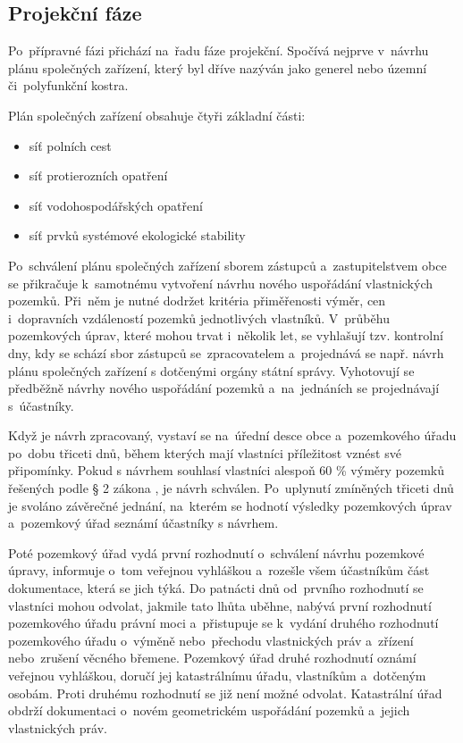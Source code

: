 \subsection{Projekční fáze}
\label{projekcni_faze}

Po~přípravné fázi přichází na~řadu fáze projekční. Spočívá nejprve
v~návrhu plánu společných zařízení, který byl dříve nazýván jako
generel nebo územní či~polyfunkční kostra.

Plán společných zařízení obsahuje čtyři základní části:
\vspace{-\topsep}
	\begin{itemize}[leftmargin=1.5cm, noitemsep]
		\item síť polních cest
		\item síť protierozních opatření
		\item síť vodohospodářských opatření
		\item síť prvků systémové ekologické stability
	\end{itemize}

Po~schválení plánu společných zařízení sborem zástupců
a~zastupitelstvem obce se přikračuje k~samotnému vytvoření návrhu
nového uspořádání vlastnických pozemků. Při~něm je nutné dodržet
kritéria přiměřenosti výměr, cen i~dopravních vzdáleností pozemků
jednotlivých vlastníků. V~průběhu pozemkových úprav, které mohou trvat
i~několik let, se vyhlašují tzv. kontrolní dny, kdy se schází sbor
zástupců se~zpraco\-vatelem a~projednává se např. návrh plánu
společných zařízení s dotčenými orgány státní správy. Vyhotovují se
předběžně návrhy nového uspořádání pozemků a~na~jednáních se projednávají
s~účastníky.

Když je návrh zpracovaný, vystaví se na~úřední desce obce
a~pozemkového úřadu po~dobu třiceti dnů, během kterých mají vlastníci
příležitost vznést své připomínky. Pokud s návrhem souhlasí vlastníci
alespoň 60 \% výměry pozemků řešených podle § 2 zákona \citep{pu_zakon},
je návrh schválen. Po~uplynutí zmíněných třiceti dnů je svoláno
závěrečné jednání, na~kterém se hodnotí výsledky pozemkových úprav
a~pozemkový úřad seznámí účastníky s návrhem.

Poté pozemkový úřad vydá
první rozhodnutí o~schválení návrhu pozemkové úpravy, informuje o~tom
veřejnou vyhláškou a~rozešle všem účastníkům část dokumentace, která
se jich týká. Do patnácti dnů od~prvního rozhodnutí se vlastníci mohou
odvolat, jakmile tato lhůta uběhne, nabývá první rozhodnutí pozemkového
úřadu právní moci a~přistupuje se k~vydání druhého rozhodnutí pozemkového
úřadu o~výměně nebo~přechodu vlastnických práv a~zřízení nebo~zrušení věcného
břemene. Pozemkový úřad druhé rozhodnutí oznámí veřejnou vyhláškou,
doručí jej kata\-strálnímu úřadu, vlastníkům a~dotčeným osobám. Proti
druhému rozhodnutí se již není možné odvolat. Kata\-strální úřad
obdrží dokumentaci o~novém geometrickém uspořádání pozemků a~jejich
vlastnických práv.


